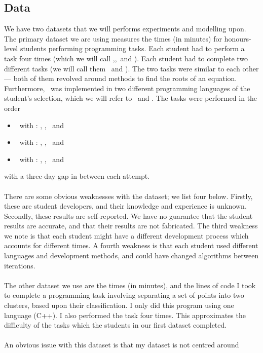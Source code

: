 \subsection{Data} \label{subsecData}

We have two datasets that we will performs experiments and modelling upon.
The primary dataset we are using measures the times (in minutes) for
honours-level students performing programming tasks.
Each student had to perform a task four times (which we will call \AZ,\AO,\AT\ 
and \ATh).
Each student had to complete two different tasks (we will call them \PO\ and
\PT).
The two tasks were similar to each other --- both of them revolved around
methods to find the roots of an equation.
Furthermore, \PO\ was implemented in two different programming languages of the
student's selection, which we will refer to \LA\ and \LB.
The tasks were performed in the order
\begin{itemize}
  \item \PO\ with \LA: \AZ, \AO, \AT\ and \ATh
  \item \PT\ with \LA: \AZ, \AO, \AT\ and \ATh
  \item \PO\ with \LB: \AZ, \AO, \AT\ and \ATh
\end{itemize}
with a three-day gap in between each attempt.\\
\\
There are some obvious weaknesses with the dataset; we list four below.
Firstly, these are student developers, and their knowledge and experience is
unknown.
Secondly, these results are self-reported.
We have no guarantee that the student results are accurate, and that their
results are not fabricated.
The third weakness we note is that each student might have a different
development process which accounts for different times.
A fourth weakness is that each student used different languages and development
methods, and could have changed algorithms between iterations.\\
\\
The other dataset we use are the times (in minutes), and the lines of code I
took to complete a programming task involving separating a set of points into
two clusters, based upon their classification.
I only did this program using one language (C++).
I also performed the task four times.
This approximates the difficulty of the tasks which the students in our first
dataset completed.\\
\\
An obvious issue with this dataset is that my dataset is not centred around
